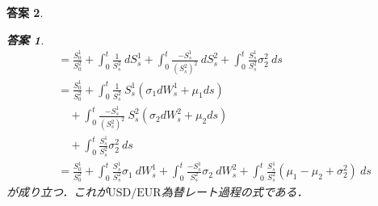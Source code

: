 \documentclass[11pt,a4paper]{jsarticle}
\theoremstyle{mystyle}
\newtheorem*{ans}{答案}
\begin{document}
\begin{ans}
\begin{ans}
\begin{align}
		&= \frac{S^{1}_{0}}{S^{2}_{0}} + \int_{0}^{t} \frac{1}{S^{2}_{s}}\ dS^{1}_{s}
		+ \int_{0}^{t} \frac{-S^{1}_{s}}{(S^{2}_{s})^{2}}\ dS^{2}_{s}
		+ \int_{0}^{t} \frac{S^{1}_{s}}{S^{2}_{s}} \sigma_{2}^{2}\ ds \\
		&= \frac{S^{1}_{0}}{S^{2}_{0}} + 
		\int_{0}^{t} \frac{1}{S^{2}_{s}}\ S^{1}_{s}(\sigma_{1}dW^{1}_{s} + \mu_{1}ds) \\
		&\quad+ \int_{0}^{t} \frac{-S^{1}_{s}}{(S^{2}_{s})^{2}}\ S^{2}_{s}(\sigma_{2}dW^{2}_{s} + \mu_{2}ds) \\
		&\quad+ \int_{0}^{t} \frac{S^{1}_{s}}{S^{2}_{s}} \sigma_{2}^{2}\ ds \\
		&= \frac{S^{1}_{0}}{S^{2}_{0}} + 
		\int_{0}^{t}\frac{S^{1}_{s}}{S^{2}_{s}}\sigma_{1}\ dW^{1}_{s}
		+ \int_{0}^{t}\frac{-S^{1}_{s}}{S^{2}_{s}}\sigma_{2}\ dW^{2}_{s}
		+ \int_{0}^{t}\frac{S^{1}_{s}}{S^{2}_{s}}(\mu_{1}-\mu_{2}+\sigma_{2}^{2})\ ds
	\end{align}
	が成り立つ．これが$\mbox{USD}/\mbox{EUR}$為替レート過程の式である．
\end{ans}

\end{ans}
\end{document}
